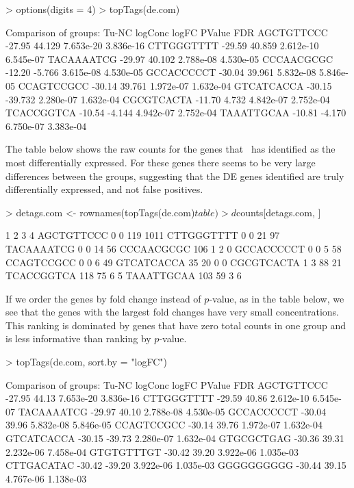 \begin{Schunk}
\begin{Sinput}
> options(digits = 4)
> topTags(de.com)
\end{Sinput}
\begin{Soutput}
Comparison of groups: Tu-NC 
           logConc   logFC    PValue       FDR
AGCTGTTCCC  -27.95  44.129 7.653e-20 3.836e-16
CTTGGGTTTT  -29.59  40.859 2.612e-10 6.545e-07
TACAAAATCG  -29.97  40.102 2.788e-08 4.530e-05
CCCAACGCGC  -12.20  -5.766 3.615e-08 4.530e-05
GCCACCCCCT  -30.04  39.961 5.832e-08 5.846e-05
CCAGTCCGCC  -30.14  39.761 1.972e-07 1.632e-04
GTCATCACCA  -30.15 -39.732 2.280e-07 1.632e-04
CGCGTCACTA  -11.70   4.732 4.842e-07 2.752e-04
TCACCGGTCA  -10.54  -4.144 4.942e-07 2.752e-04
TAAATTGCAA  -10.81  -4.170 6.750e-07 3.383e-04
\end{Soutput}
\end{Schunk}

The table below shows the raw counts for the genes that \edgeR~has
identified as the most differentially expressed. For these genes there
seems to be very large differences between the groups, suggesting that
the DE genes identified are truly differentially expressed, and not
false positives.

\begin{Schunk}
\begin{Sinput}
> detags.com <- rownames(topTags(de.com)$table)
> d$counts[detags.com, ]
\end{Sinput}
\begin{Soutput}
             1  2   3    4
AGCTGTTCCC   0  0 119 1011
CTTGGGTTTT   0  0  21   97
TACAAAATCG   0  0  14   56
CCCAACGCGC 106  1   2    0
GCCACCCCCT   0  0   5   58
CCAGTCCGCC   0  0   6   49
GTCATCACCA  35 20   0    0
CGCGTCACTA   1  3  88   21
TCACCGGTCA 118 75   6    5
TAAATTGCAA 103 59   3    6
\end{Soutput}
\end{Schunk}

If we order the genes by fold change instead of $p$-value, as in the
table below, we see that the genes with the largest fold changes have
very small concentrations. This ranking is dominated by genes that
have zero total counts in one group and is less informative than
ranking by $p$-value.

\begin{Schunk}
\begin{Sinput}
> topTags(de.com, sort.by = "logFC")
\end{Sinput}
\begin{Soutput}
Comparison of groups: Tu-NC 
           logConc  logFC    PValue       FDR
AGCTGTTCCC  -27.95  44.13 7.653e-20 3.836e-16
CTTGGGTTTT  -29.59  40.86 2.612e-10 6.545e-07
TACAAAATCG  -29.97  40.10 2.788e-08 4.530e-05
GCCACCCCCT  -30.04  39.96 5.832e-08 5.846e-05
CCAGTCCGCC  -30.14  39.76 1.972e-07 1.632e-04
GTCATCACCA  -30.15 -39.73 2.280e-07 1.632e-04
GTGCGCTGAG  -30.36  39.31 2.232e-06 7.458e-04
GTGTGTTTGT  -30.42  39.20 3.922e-06 1.035e-03
CTTGACATAC  -30.42 -39.20 3.922e-06 1.035e-03
GGGGGGGGGG  -30.44  39.15 4.767e-06 1.138e-03
\end{Soutput}
\end{Schunk}

